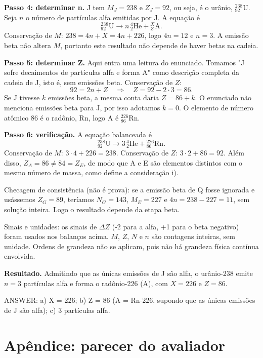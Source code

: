 \documentclass{article}%
\begin{document}
\textbf{Passo 4: determinar n.} J tem $M_J = 238$ e $Z_J = 92$, ou seja, é o urânio, ${}^{238}_{92}\mathrm{U}$. Seja $n$ o número de partículas alfa emitidas por J. A equação é
\[
{}^{238}_{92}\mathrm{U} \longrightarrow n\,{}^{4}_{2}\mathrm{He} + {}^{X}_{Z}\mathrm{A}.
\]
Conservação de $M$: $238 = 4n + X = 4n + 226$, logo $4n = 12$ e $n = 3$. A emissão beta não altera $M$, portanto este resultado não depende de haver betas na cadeia.

\textbf{Passo 5: determinar Z.} Aqui entra uma leitura do enunciado. Tomamos "J sofre decaimentos de partículas alfa e forma A" como descrição completa da cadeia de J, isto é, sem emissões beta. Conservação de $Z$:
\[
92 = 2n + Z \quad\Rightarrow\quad Z = 92 - 2 \cdot 3 = 86.
\]
Se J tivesse $k$ emissões beta, a mesma conta daria $Z = 86 + k$. O enunciado não menciona emissões beta para J, por isso adotamos $k = 0$. O elemento de número atômico 86 é o radônio, Rn, logo A é ${}^{226}_{86}\mathrm{Rn}$.

\textbf{Passo 6: verificação.} A equação balanceada é
\[
{}^{238}_{92}\mathrm{U} \longrightarrow 3\,{}^{4}_{2}\mathrm{He} + {}^{226}_{86}\mathrm{Rn}.
\]
Conservação de $M$: $3 \cdot 4 + 226 = 238$. Conservação de $Z$: $3 \cdot 2 + 86 = 92$. Além disso, $Z_A = 86 \neq 84 = Z_E$, de modo que A e E são elementos distintos com o mesmo número de massa, como define a consideração i).

Checagem de consistência (não é prova): se a emissão beta de Q fosse ignorada e usássemos $Z_G = 89$, teríamos $N_G = 143$, $M_E = 227$ e $4n = 238 - 227 = 11$, sem solução inteira. Logo o resultado depende da etapa beta.

Sinais e unidades: os sinais de $\Delta Z$ (-2 para a alfa, +1 para o beta negativo) foram usados nos balanços acima. $M$, $Z$, $N$ e $n$ são contagens inteiras, sem unidade. Ordens de grandeza não se aplicam, pois não há grandeza física contínua envolvida.

\textbf{Resultado.} Admitindo que as únicas emissões de J são alfa, o urânio-238 emite $n = 3$ partículas alfa e forma o radônio-226 (A), com $X = 226$ e $Z = 86$.

ANSWER: a) X = 226; b) Z = 86 (A = Rn-226, supondo que as únicas emissões de J são alfa); c) 3 partículas alfa.%
\newpage%
\section*{Apêndice: parecer do avaliador}%
\end{document}
